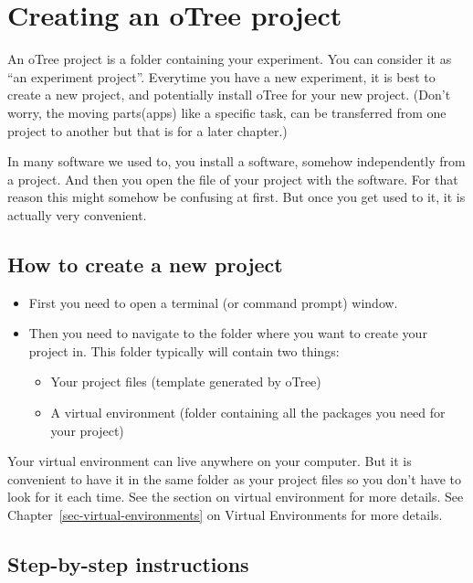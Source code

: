 \documentclass[
  letterpaper,
  DIV=11,
  numbers=noendperiod]{scrreprt}
\providecommand{\tightlist}{%
  \setlength{\itemsep}{0pt}\setlength{\parskip}{0pt}}\usepackage{longtable,booktabs,array}
\begin{document}
\hypertarget{creating-an-otree-project}{%
\chapter{Creating an oTree project}\label{creating-an-otree-project}}

An oTree project is a folder containing your experiment. You can
consider it as ``an experiment project''. Everytime you have a new
experiment, it is best to create a new project, and potentially install
oTree for your new project. (Don't worry, the moving parts(apps) like a
specific task, can be transferred from one project to another but that
is for a later chapter.)

In many software we used to, you install a software, somehow
independently from a project. And then you open the file of your project
with the software. For that reason this might somehow be confusing at
first. But once you get used to it, it is actually very convenient.

\hypertarget{how-to-create-a-new-project}{%
\section{How to create a new
project}\label{how-to-create-a-new-project}}

\begin{itemize}
\tightlist
\item
  First you need to open a terminal (or command prompt) window.
\item
  Then you need to navigate to the folder where you want to create your
  project in. This folder typically will contain two things:

  \begin{itemize}
  \tightlist
  \item
    Your project files (template generated by oTree)
  \item
    A virtual environment (folder containing all the packages you need
    for your project)
  \end{itemize}
\end{itemize}

Your virtual environment can live anywhere on your computer. But it is
convenient to have it in the same folder as your project files so you
don't have to look for it each time. See the section on virtual
environment for more details. See Chapter~\ref{sec-virtual-environments}
on Virtual Environments for more details.

\hypertarget{step-by-step-instructions}{%
\section{Step-by-step instructions}\label{step-by-step-instructions}}
\end{document}
